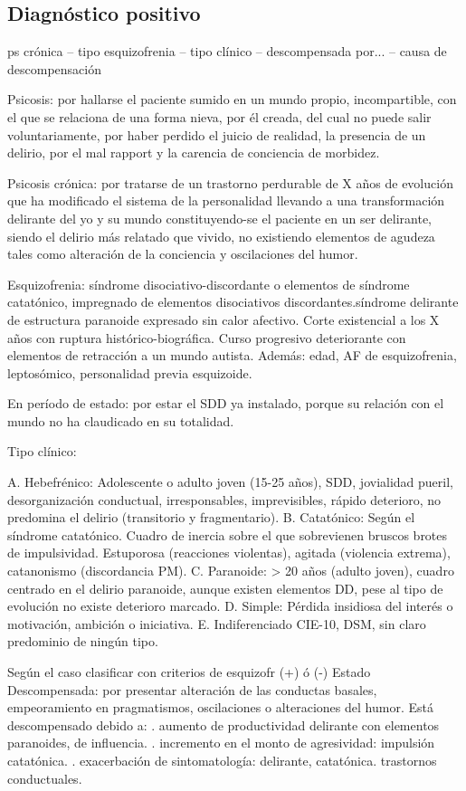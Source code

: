 \subsection*{Diagnóstico positivo}
ps crónica – tipo esquizofrenia – tipo clínico – descompensada por... – causa de descompensación

Psicosis: por hallarse el paciente sumido en un mundo propio, incompartible, con el que se relaciona de una forma nieva, por él creada, del cual no puede salir voluntariamente, por haber perdido el juicio de realidad, la presencia de un delirio, por el mal rapport y la carencia de conciencia de morbidez.

Psicosis crónica: por tratarse de un trastorno perdurable de X años de evolución que ha modificado el sistema de la personalidad llevando a una transformación delirante del yo y su mundo constituyendo-se el paciente en un ser delirante, siendo el delirio más relatado que vivido, no existiendo elementos de agudeza tales como alteración de la conciencia y oscilaciones del humor.

Esquizofrenia: síndrome disociativo-discordante o elementos de síndrome catatónico, impregnado de elementos disociativos discordantes.síndrome delirante de estructura paranoide expresado sin calor afectivo. Corte existencial a los X años con ruptura histórico-biográfica. Curso progresivo deteriorante con elementos de retracción a un mundo autista. Además: edad, AF de esquizofrenia, leptosómico, personalidad previa esquizoide.

En período de estado: por estar el SDD ya instalado, porque su relación con el mundo no ha claudicado en su totalidad. 

Tipo clínico: 

A. Hebefrénico: Adolescente o adulto joven (15-25 años), SDD, jovialidad pueril, desorganización conductual, irresponsables, imprevisibles, rápido deterioro, no predomina el delirio (transitorio y fragmentario). 
B. Catatónico: Según el síndrome catatónico. Cuadro de inercia sobre el que sobrevienen bruscos brotes de impulsividad. Estuporosa (reacciones violentas), agitada (violencia extrema), catanonismo (discordancia PM). 
C. Paranoide: > 20 años (adulto joven), cuadro centrado en el delirio paranoide, aunque existen elementos DD, pese al tipo de evolución no existe deterioro marcado. 
D. Simple: Pérdida insidiosa del interés o motivación, ambición o iniciativa. 
E. Indiferenciado CIE-10, DSM, sin claro predominio de ningún tipo.

Según el caso clasificar con criterios de esquizofr (+) ó (-) Estado Descompensada: por presentar alteración de las conductas basales, empeoramiento en pragmatismos, oscilaciones o alteraciones del humor. Está descompensado debido a: . aumento de productividad delirante con elementos paranoides, de influencia. . incremento en el monto de agresividad: impulsión catatónica. . exacerbación de sintomatología: delirante, catatónica. trastornos conductuales.

